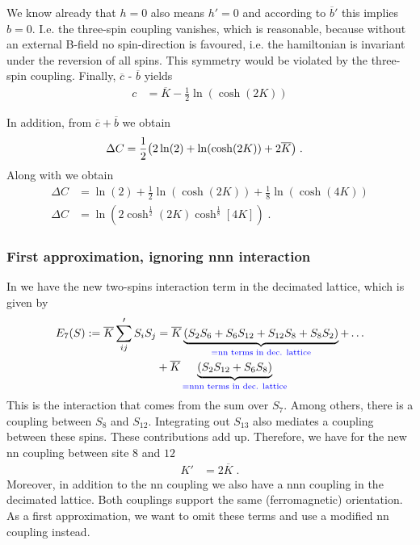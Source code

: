 We know already that $h=0$ also means $h'=0$ and according to $\overline b'$ this implies    $b=0$. 
I.e. the three-spin coupling  vanishes, which is reasonable, because without an external B-field no spin-direction  is favoured, i.e. the hamiltonian is invariant under the reversion of all spins. This symmetry would be violated by the three-spin coupling.
Finally, $\overline c$ - $\overline b$ yields
%
\begin{align}\label{eq:four:spin:term}
c &= \overline K  - \frac{1}{2}\ln(\cosh(2 K))
\end{align}
%



In addition, from $\overline c + \overline b$ we obtain
%
\begin{align*}
\Delta C &= \frac{1}{2}\qty( 2\ln(2) +  \ln(\cosh(2K)) +    2 \overline K )\;.
\end{align*}
%
Along with  we obtain
%
\begin{align}\label{eq:Delta:a}
\Delta C &=   \ln(2) + \frac{1}{2}\ln(\cosh(2K))  + \frac{1}{8}\ln(\cosh(4 K)) \\
\Delta C &=   \ln(2 \cosh^{\frac{1}{2}}(2K)\cosh^{\frac{1}{8}}[4 K]) \;.
\end{align}
%


\subsubsection{First approximation, ignoring nnn interaction}
 
 
In  we have the new two-spins interaction term in the decimated lattice, which is given by
%
\begin{align}\label{eq:E7}
E_{7}(S) :=
 \overline K \sum'_{ij} S_{i}S_{j} &=
 \overline K
\underbrace{
\qty(S_{2}S_{6}+S_{6}S_{12}+S_{12}S_{8}+S_{8}S_{2})
}_{\color{blue} = \text{nn terms in dec. lattice}}
+ \ldots\\
&+
\overline K
\underbrace{\qty(S_{2}S_{12}+S_{6}S_{8})}_{\color{blue} = \text{nnn terms in dec. lattice}}
\end{align}
%
This is the interaction that comes from the sum over $S_{7}$. 
Among others, there  is  a coupling between $S_{8}$ and $S_{12}$.
Integrating out $S_{13}$ also mediates a coupling between these spins. 
These contributions add up. Therefore, we 
have for the new nn coupling between site $8$ and $12$
%
\begin{align*}
K' &= 2 \overline K\;.
\end{align*}
%
Moreover, in addition to the nn coupling we also have a nnn
coupling in the decimated lattice. Both couplings 
support the same  (ferromagnetic) orientation. 
As a first approximation, we want to omit these terms and use 
a modified nn coupling instead.

